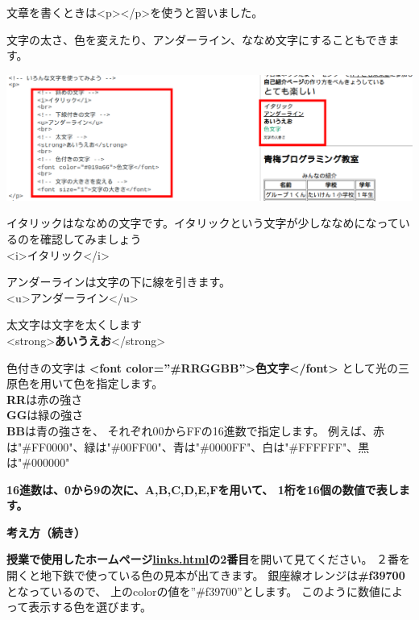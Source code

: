 \documentclass[a4paper,12pt]{jarticle}
\begin{document}
文章を書くときは{\textless}p{\textgreater}{\textless}/p{\textgreater}を使うと習いました。

文字の太さ、色を変えたり、アンダーライン、ななめ文字にすることもできます。

\centering
\includegraphics[width=14.284cm]{textbook-img186.png}

\bigskip

\flushleft

イタリックはななめの文字です。イタリックという文字が少しななめになっているのを確認してみましょう\\
{\textless}i{\textgreater}イタリック{\textless}/i{\textgreater}\\

\bigskip

アンダーラインは文字の下に線を引きます。\\
{\textless}u{\textgreater}アンダーライン{\textless}/u{\textgreater}\\

\bigskip

太文字は文字を太くします\\
{\textless}strong{\textgreater}\textbf{あいうえお}{\textless}/strong{\textgreater}


\bigskip
色付きの文字は
\textbf{{\textless}font color=”\#RRGGBB”{\textgreater}色文字{\textless}/font{\textgreater}}
として光の三原色を用いて色を指定します。\\
\textbf{RR}は赤の強さ\\
\textbf{GG}は緑の強さ\\
\textbf{BB}は青の強さを、
それぞれ00からFFの16進数で指定します。
例えば、赤は"\#FF0000"、緑は"\#00FF00"、青は"\#0000FF"、白は"\#FFFFFF"、黒は"\#000000"

\bigskip
\textbf{16進数は、0から9の次に、A,B,C,D,E,Fを用いて、
  1桁を16個の数値で表します。}

\bigskip



\clearpage
\textbf{考え方（続き）}



\textbf{授業で使用したホームページ\url{links.html}の2番目}を開いて見てください。
２番を開くと地下鉄で使っている色の見本が出てきます。
銀座線オレンジは\textbf{\#f39700}となっているので、
上のcolorの値を”\#f39700”とします。
このように数値によって表示する色を選びます。
\end{document}
